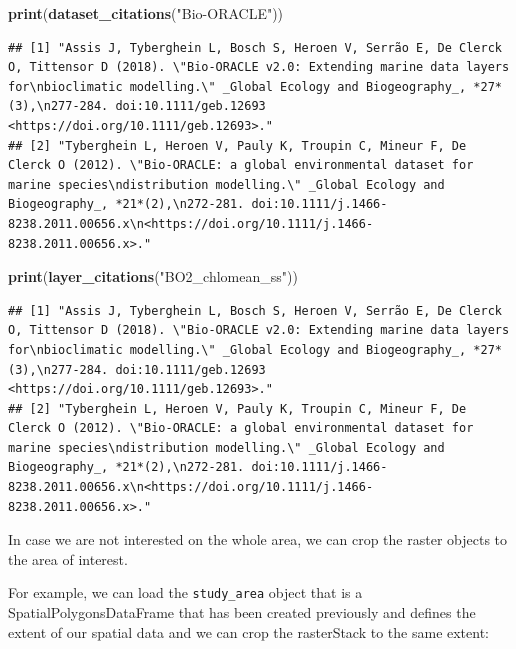 \documentclass[
]{book}
\newenvironment{Shaded}{\begin{snugshade}}{\end{snugshade}}
\newcommand{\FunctionTok}[1]{\textcolor[rgb]{0.13,0.29,0.53}{\textbf{#1}}}
\newcommand{\NormalTok}[1]{#1}
\newcommand{\StringTok}[1]{\textcolor[rgb]{0.31,0.60,0.02}{#1}}
\begin{document}
\begin{Shaded}
\begin{Highlighting}[]
\FunctionTok{print}\NormalTok{(}\FunctionTok{dataset\_citations}\NormalTok{(}\StringTok{"Bio{-}ORACLE"}\NormalTok{))}
\end{Highlighting}
\end{Shaded}

\begin{verbatim}
## [1] "Assis J, Tyberghein L, Bosch S, Heroen V, Serrão E, De Clerck O, Tittensor D (2018). \"Bio‐ORACLE v2.0: Extending marine data layers for\nbioclimatic modelling.\" _Global Ecology and Biogeography_, *27*(3),\n277-284. doi:10.1111/geb.12693 <https://doi.org/10.1111/geb.12693>."                                 
## [2] "Tyberghein L, Heroen V, Pauly K, Troupin C, Mineur F, De Clerck O (2012). \"Bio-ORACLE: a global environmental dataset for marine species\ndistribution modelling.\" _Global Ecology and Biogeography_, *21*(2),\n272-281. doi:10.1111/j.1466-8238.2011.00656.x\n<https://doi.org/10.1111/j.1466-8238.2011.00656.x>."
\end{verbatim}

\begin{Shaded}
\begin{Highlighting}[]
\FunctionTok{print}\NormalTok{(}\FunctionTok{layer\_citations}\NormalTok{(}\StringTok{"BO2\_chlomean\_ss"}\NormalTok{))}
\end{Highlighting}
\end{Shaded}

\begin{verbatim}
## [1] "Assis J, Tyberghein L, Bosch S, Heroen V, Serrão E, De Clerck O, Tittensor D (2018). \"Bio‐ORACLE v2.0: Extending marine data layers for\nbioclimatic modelling.\" _Global Ecology and Biogeography_, *27*(3),\n277-284. doi:10.1111/geb.12693 <https://doi.org/10.1111/geb.12693>."                                 
## [2] "Tyberghein L, Heroen V, Pauly K, Troupin C, Mineur F, De Clerck O (2012). \"Bio-ORACLE: a global environmental dataset for marine species\ndistribution modelling.\" _Global Ecology and Biogeography_, *21*(2),\n272-281. doi:10.1111/j.1466-8238.2011.00656.x\n<https://doi.org/10.1111/j.1466-8238.2011.00656.x>."
\end{verbatim}

In case we are not interested on the whole area, we can crop the raster objects to the area of interest.

For example, we can load the \texttt{study\_area} object that is a SpatialPolygonsDataFrame that has been created previously and defines the extent of our spatial data and we can crop the rasterStack to the same extent:
\end{document}
